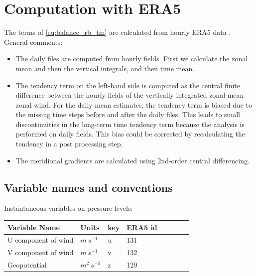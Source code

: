 \documentclass[11pt]{article}
\numberwithin{equation}{section}
\begin{document}
\section{Computation with ERA5}
The terms of \eqref{eq:balance_rb_tm} are calculated from hourly ERA5 data \citep{EuropeanCentreForMedium-RangeWeatherForecasts2017}. General comments:

\begin{itemize}

\item The daily files are computed from hourly fields. First we calculate the zonal mean and then the vertical integrals, and then time mean.

\item The tendency term on the left-hand side is computed as the central finite difference between the hourly fields of the vertically integrated zonal-mean zonal wind. For the daily mean estimates, the tendency term is biased due to the missing time steps before and after the daily files. This leads to small discontinuities in the long-term time tendency term because the analysis is performed on daily fields. This bias could be corrected by recalculating the tendency in a post processing step.
\item The meridional gradients are calculated using 2nd-order central differencing.
\end{itemize}


\subsection{Variable names and conventions}

Instantaneous variables on pressure levels:
\begin{table}[h!]
\label{table:pressure_var}
\begin{center}
    \begin{tabular}{ | l | l | l | l | l | l | l | l |}
    \hline
    Variable Name & Units & key & ERA5 id \\ \hline
     U component of wind & $m~s^{-1}$   & u    &  131  \\ \hline
     V component of wind & $m~s^{-1}$   & v    &  132\\ \hline
     Geopotential & $m^2~s^{-2}$   & z    &  129\\ \hline
        \end{tabular}
\end{center}
\end{table}
\end{document}
